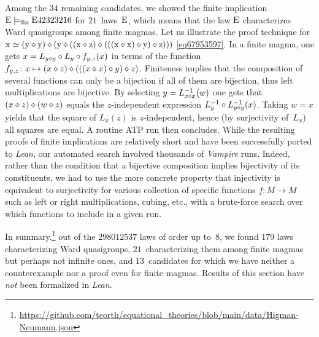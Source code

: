 Among the $34$ remaining candidates, we showed the finite implication $\mathrm{E}\models_{\mathrm{fin}}\mathrm{E}42323216$ for $21$~laws~$\mathrm{E}$, which means that the law $\mathrm{E}$ characterizes Ward quasigroups among finite magmas.  Let us illustrate the proof technique for $\mathrm{x} \simeq (\mathrm{y} \diamond \mathrm{y}) \diamond (\mathrm{y} \diamond ((\mathrm{x} \diamond \mathrm{z}) \diamond (((\mathrm{x} \diamond \mathrm{x}) \diamond \mathrm{y}) \diamond \mathrm{z})))$ \eqref{eq67953597}.  In a finite magma, one gets $x = L_{y\diamond y} \circ L_y \circ f_{y,z}(x)$ in terms of the function $f_{y,z}\colon x \mapsto (x\diamond z) \diamond (((x \diamond x) \diamond y) \diamond z)$.  Finiteness implies that the composition of several functions can only be a bijection if all of them are bijection, thus left multiplications are bijective.  By selecting $y=L_{x\diamond x}^{-1}(w)$ one gets that $(x\diamond z)\diamond (w\diamond z)$ equals the $z$-independent expression $L_y^{-1} \circ L_{y\diamond y}^{-1}(x)$.  Taking $w=x$ yields that the square of $L_x(z)$ is $z$-independent, hence (by surjectivity of~$L_x$) all squares are equal.  A routine ATP run then concludes.
While the resulting proofs of finite implications are relatively short and have been successfully ported to \emph{Lean}, our automated search involved thousands of \emph{Vampire} runs.
Indeed, rather than the condition that a bijective composition implies bijectivity of its constituents, we had to use the more concrete property that injectivity is equivalent to surjectivity for various collection of specific functions $f\colon M\to M$ such as left or right multiplications, cubing, etc.\@, with a brute-force search over which functions to include in a given run.

In summary,\footnote{\url{https://github.com/teorth/equational_theories/blob/main/data/Higman-Neumann.json}} out of the $\num{298012537}$ laws of order up to~$8$, we found $179$ laws characterizing Ward quasigroups, $21$~characterizing them among finite magmas but perhaps not infinite ones, and $13$~candidates for which we have neither a counterexample nor a proof even for finite magmas.  Results of this section have \emph{not} been formalized in \emph{Lean}.

